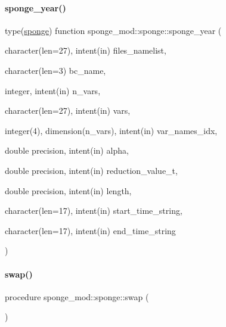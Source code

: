 \mbox{\label{structsponge__mod_1_1sponge_a9f7844c5d77b32ce566d362f29d4b816}} 
\paragraph{\texorpdfstring{sponge\+\_\+year()}{sponge\_year()}}
{\footnotesize\ttfamily type(\mbox{\hyperlink{structsponge__mod_1_1sponge}{sponge}}) function sponge\+\_\+mod\+::sponge\+::sponge\+\_\+year (\begin{DoxyParamCaption}\item[{character(len=27), intent(in)}]{files\+\_\+namelist,  }\item[{character(len=3)}]{bc\+\_\+name,  }\item[{integer, intent(in)}]{n\+\_\+vars,  }\item[{character(len=27), intent(in)}]{vars,  }\item[{integer(4), dimension(n\+\_\+vars), intent(in)}]{var\+\_\+names\+\_\+idx,  }\item[{double precision, intent(in)}]{alpha,  }\item[{double precision, intent(in)}]{reduction\+\_\+value\+\_\+t,  }\item[{double precision, intent(in)}]{length,  }\item[{character(len=17), intent(in)}]{start\+\_\+time\+\_\+string,  }\item[{character(len=17), intent(in)}]{end\+\_\+time\+\_\+string }\end{DoxyParamCaption})\hspace{0.3cm}{\ttfamily [private]}}

\mbox{\label{structsponge__mod_1_1sponge_abe0102a0a72e189b8871724a21680c43}} 
\paragraph{\texorpdfstring{swap()}{swap()}}
{\footnotesize\ttfamily procedure sponge\+\_\+mod\+::sponge\+::swap (\begin{DoxyParamCaption}{ }\end{DoxyParamCaption})\hspace{0.3cm}{\ttfamily [private]}}



